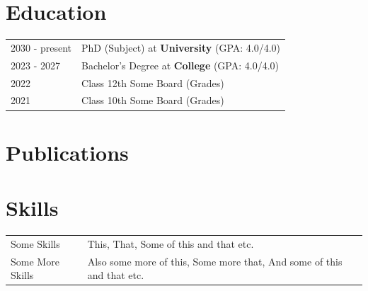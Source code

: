\documentclass[a4paper,12pt]{article}
\begin{document}
\section{Education}
\begin{tabularx}{\linewidth}{@{}l X@{}}	
2030 - present & PhD (Subject) at \textbf{University} \hfill \normalsize (GPA: 4.0/4.0) \\

2023 - 2027 & Bachelor's Degree at \textbf{College} \hfill (GPA: 4.0/4.0) \\ 

2022 & Class 12th Some Board \hfill  (Grades) \\

2021 & Class 10th Some Board \hfill  (Grades) \\
\end{tabularx}

\section{Publications}
\begin{refsection}
\nocite{*}
\printbibliography[heading=none]
\end{refsection}

\section{Skills}
\begin{tabularx}{\linewidth}{@{}l X@{}}
Some Skills &  \normalsize{This, That, Some of this and that etc.}\\
Some More Skills  &  \normalsize{Also some more of this, Some more that, And some of this and that etc.}\\  
\end{tabularx}

\vfill
{}
\end{document}
